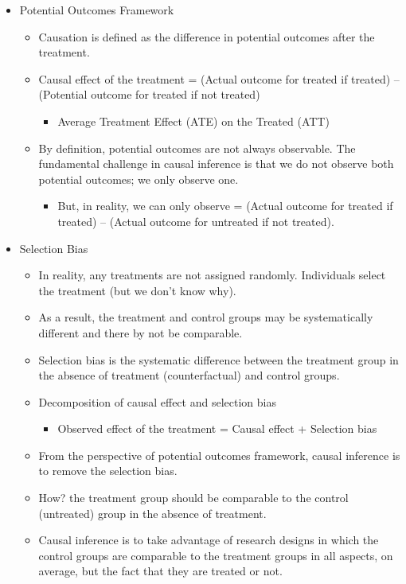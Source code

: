 \documentclass[
]{book}
\providecommand{\tightlist}{%
  \setlength{\itemsep}{0pt}\setlength{\parskip}{0pt}}
\theoremstyle{definition}
\theoremstyle{definition}
\theoremstyle{definition}
\theoremstyle{definition}
\theoremstyle{remark}
\begin{document}
\begin{itemize}
\tightlist
\item
  Potential Outcomes Framework

  \begin{itemize}
  \tightlist
  \item
    Causation is defined as the difference in potential outcomes after the treatment.
  \item
    Causal effect of the treatment = (Actual outcome for treated if treated) -- (Potential outcome for treated if not treated)

    \begin{itemize}
    \tightlist
    \item
      Average Treatment Effect (ATE) on the Treated (ATT)
    \end{itemize}
  \item
    By definition, potential outcomes are not always observable. The fundamental challenge in causal inference is that we do not observe both potential outcomes; we only observe one.

    \begin{itemize}
    \tightlist
    \item
      But, in reality, we can only observe = (Actual outcome for treated if treated) -- (Actual outcome for untreated if not treated).
    \end{itemize}
  \end{itemize}
\item
  Selection Bias

  \begin{itemize}
  \tightlist
  \item
    In reality, any treatments are not assigned randomly. Individuals select the treatment (but we don't know why).
  \item
    As a result, the treatment and control groups may be systematically different and there by not be comparable.
  \item
    Selection bias is the systematic difference between the treatment group in the absence of treatment (counterfactual) and control groups.
  \item
    Decomposition of causal effect and selection bias

    \begin{itemize}
    \tightlist
    \item
      Observed effect of the treatment = Causal effect + Selection bias
    \end{itemize}
  \item
    From the perspective of potential outcomes framework, causal inference is to remove the selection bias.
  \item
    How? the treatment group should be comparable to the control (untreated) group in the absence of treatment.
  \item
    Causal inference is to take advantage of research designs in which the control groups are comparable to the treatment groups in all aspects, on average, but the fact that they are treated or not.
  \end{itemize}
\end{itemize}
\end{document}
